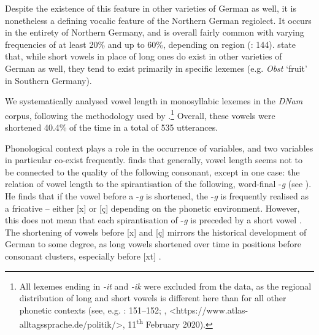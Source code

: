 \documentclass[output=paper]{langsci/langscibook}
\begin{document}
Despite the existence of this feature in other varieties of German as well, it is nonetheless a defining vocalic feature of the Northern German regiolect. It occurs in the entirety of Northern Germany, and is overall fairly common with varying frequencies of at least 20\% and up to 60\%, depending on region (\citealt{elmentaler_norddeutscher_2015}: 144).  \citet[142]{elmentaler_norddeutscher_2015} state that, while short vowels in place of long ones do exist in other varieties of German as well, they tend to exist primarily in specific lexemes (e.g. \textit{Obst} ‘fruit’ in Southern Germany). 

We systematically analysed vowel length in monosyllabic lexemes in the \textit{DNam} corpus, following the methodology used by  \citet[144]{elmentaler_norddeutscher_2015}.\footnote{All lexemes ending in \textit{-it} and \textit{-ik} were excluded from the data, as the regional distribution of long and short vowels is different here than for all other phonetic contexts (see, e.g. \citealt{elmentaler_norddeutscher_2015}: 151--152; \citealt{elspas_atlas_2003}, <https://www.atlas-alltagssprache.de/politik/>, 11\textsuperscript{th} February 2020).} Overall, these vowels were shortened 40.4\% of the time in a total of 535 utterances.

Phonological context plays a role in the occurrence of variables, and two variables in particular co-exist frequently. \citet[77]{elmentaler_varietatendynamik_2008} finds that generally, vowel length seems not to be connected to the quality of the following consonant, except in one case: the relation of vowel length to the spirantisation of the following, word-final -\textit{g} (see ). He finds that if the vowel before a -\textit{g} is shortened, the -\textit{g} is frequently realised as a fricative – either [x] or [ç] depending on the phonetic environment. However, this does not mean that each spirantisation of -\textit{g} is preceded by a short vowel \citep[77]{elmentaler_varietatendynamik_2008}. The shortening of vowels before [x] and [ç] mirrors the historical development of German to some degree, as long vowels shortened over time in positions before consonant clusters, especially before [xt] \citep[152]{szulc_historische_1987}. 
\end{document}
